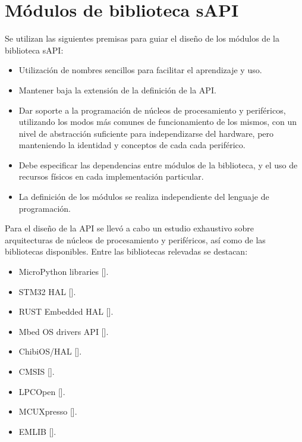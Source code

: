 \section{Módulos de biblioteca sAPI}
\label{sec:modelLibrary}

Se utilizan las siguientes premisas para guiar el diseño de los módulos de la biblioteca sAPI:

\begin{itemize}
\item
Utilización de nombres sencillos para facilitar el aprendizaje y uso.
\item
Mantener baja la extensión de la definición de la API.
\item
Dar soporte a la programación de núcleos de procesamiento y periféricos, utilizando los modos más comunes de funcionamiento de los mismos, con un nivel de abstracción suficiente para independizarse del hardware, pero manteniendo la identidad y conceptos de cada cada periférico.
\item
Debe especificar las dependencias entre módulos de la biblioteca, y el uso de recursos físicos en cada implementación particular.
\item
La definición de los módulos se realiza independiente del lenguaje de programación.
\end{itemize}

Para el diseño de la API se llevó a cabo un estudio exhaustivo sobre arquitecturas de núcleos de procesamiento y periféricos, así como de las bibliotecas disponibles. Entre las bibliotecas relevadas se destacan:

\begin{itemize}
\item
MicroPython libraries []. %
\item
STM32 HAL []. %
\item
RUST Embedded HAL []. %
\item
Mbed OS drivers API []. %
\item
ChibiOS/HAL []. %
\item
CMSIS [].
\item
LPCOpen [].
\item
MCUXpresso [].
\item
EMLIB []. %
\end{itemize}

